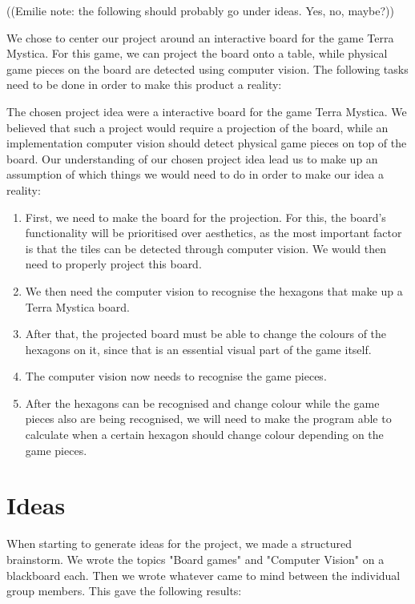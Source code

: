 ((Emilie note: the following should probably go under ideas. Yes, no, maybe?))

We chose to center our project around an interactive board for the game Terra Mystica. For this game, we can project the board onto a table, while physical game pieces on the board are detected using computer vision. The following tasks need to be done in order to make this product a reality:


The chosen project idea were a interactive board for the game Terra Mystica. We believed that such a project would require a projection of the board, while an implementation computer vision should detect physical game pieces on top of the board.
Our understanding of our chosen project idea lead us to make up an assumption of which things we would need to do in order to make our idea a reality:

\begin{enumerate}
\item First, we need to make the board for the projection. For this, the board's functionality will be prioritised over aesthetics, as the most important factor is that the tiles can be detected through computer vision. We would then need to properly project this board.
\item We then need the computer vision to recognise the hexagons that make up a Terra Mystica board.
\item After that, the projected board must be able to change the colours of the hexagons on it, since that is an essential visual part of the game itself.
\item The computer vision now needs to recognise the game pieces.
\item After the hexagons can be recognised and change colour while the game pieces also are being recognised, we will need to make the program able to calculate when a certain hexagon should change colour depending on the game pieces.
\end{enumerate}

\section{Ideas}\label{sec:idea}
When starting to generate ideas for the project, we made a structured brainstorm. We wrote the topics "Board games" and "Computer Vision" on a blackboard each. Then we wrote whatever came to mind between the individual group members. This gave the following results: 

